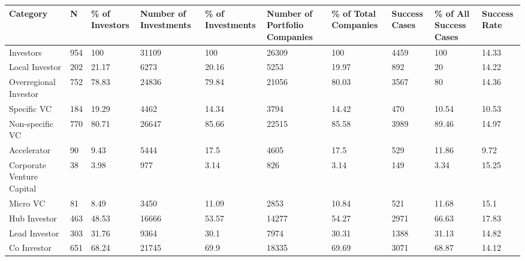 \begin{tabular}{llllllllll}
  \toprule
Category & N & \% of Investors & Number of Investments & \% of Investments & Number of Portfolio Companies & \% of Total Companies & Success Cases & \% of All Success Cases & Success Rate \\ 
  \midrule
Investors & 954 & 100 & 31109 & 100 & 26309 & 100 & 4459 & 100 & 14.33 \\ 
  Local Investor & 202 & 21.17 & 6273 & 20.16 & 5253 & 19.97 & 892 & 20 & 14.22 \\ 
  Overregional Investor & 752 & 78.83 & 24836 & 79.84 & 21056 & 80.03 & 3567 & 80 & 14.36 \\ 
  Specific VC & 184 & 19.29 & 4462 & 14.34 & 3794 & 14.42 & 470 & 10.54 & 10.53 \\ 
  Non-specific VC & 770 & 80.71 & 26647 & 85.66 & 22515 & 85.58 & 3989 & 89.46 & 14.97 \\ 
  Accelerator & 90 & 9.43 & 5444 & 17.5 & 4605 & 17.5 & 529 & 11.86 & 9.72 \\ 
  Corporate Venture Capital & 38 & 3.98 & 977 & 3.14 & 826 & 3.14 & 149 & 3.34 & 15.25 \\ 
  Micro VC & 81 & 8.49 & 3450 & 11.09 & 2853 & 10.84 & 521 & 11.68 & 15.1 \\ 
  Hub Investor & 463 & 48.53 & 16666 & 53.57 & 14277 & 54.27 & 2971 & 66.63 & 17.83 \\ 
  Lead Investor & 303 & 31.76 & 9364 & 30.1 & 7974 & 30.31 & 1388 & 31.13 & 14.82 \\ 
  Co Investor & 651 & 68.24 & 21745 & 69.9 & 18335 & 69.69 & 3071 & 68.87 & 14.12 \\ 
   \bottomrule
\end{tabular}
